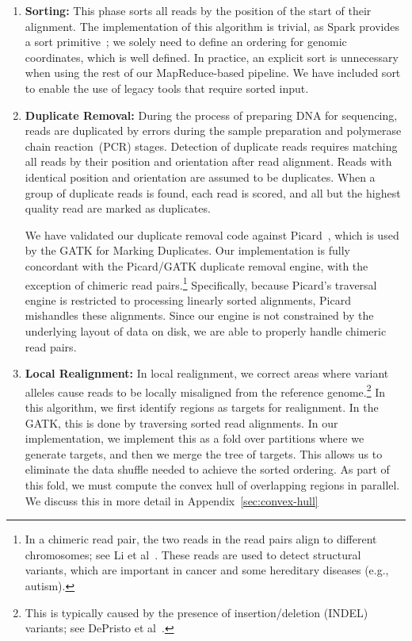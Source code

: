 \documentclass{acm_proc_article-sp}
\begin{document}
\begin{enumerate}
\item \textbf{Sorting:} This phase sorts all reads by the position of the start of their alignment. The implementation
of this algorithm is trivial, as Spark provides a sort primitive~\cite{zaharia10}; we solely need to define an
ordering for genomic coordinates, which is well defined. In practice, an explicit sort is unnecessary when using
the rest of our MapReduce-based pipeline. We have included sort to enable the use of legacy tools that require
sorted input.
\item \textbf{Duplicate Removal:} During the process of preparing DNA for sequencing, reads are duplicated by
errors during the sample preparation and polymerase chain reaction~(PCR) stages. Detection of duplicate reads
requires matching all reads by their position and orientation after read alignment. Reads with identical position
and orientation are assumed to be duplicates. When a group of duplicate reads is found, each read is scored,
and all but the highest quality read are marked as duplicates.

We have validated our duplicate removal code against Picard~\cite{picard}, which is used by the GATK
for Marking Duplicates. Our implementation is fully concordant with the Picard/GATK duplicate removal
engine, with the exception of chimeric read pairs.\footnote{In a chimeric read pair, the two reads in the
read pairs align to different chromosomes; see Li et al~\cite{li10}. These reads are used to detect
structural variants, which are important in cancer and some hereditary diseases (e.g., autism).}
Specifically, because Picard's traversal engine is restricted to processing linearly sorted alignments,
Picard mishandles these alignments. Since our engine is not constrained by the underlying layout of data
on disk, we are able to properly handle chimeric read pairs.
\item \textbf{Local Realignment:} In local realignment, we correct areas where variant alleles cause reads to be
locally misaligned from the reference genome.\footnote{This is typically caused by the presence of
insertion/deletion (INDEL) variants; see DePristo et al~\cite{depristo11}.} In this algorithm, we first identify regions
as targets for realignment. In the GATK, this is done by traversing sorted read alignments. In our implementation,
we implement this as a fold over partitions where we generate targets, and then we merge the tree of targets.
This allows us to eliminate the data shuffle needed to achieve the sorted ordering. As part of this fold, we must
compute the convex hull of overlapping regions in parallel. We discuss this in more detail in
Appendix~\ref{sec:convex-hull}


\end{enumerate}
\end{document}
